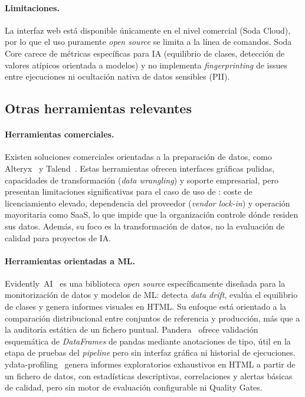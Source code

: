 \paragraph{Limitaciones.}
La interfaz web está disponible únicamente en el nivel comercial (Soda Cloud),
por lo que el uso puramente \emph{open source} se limita a la línea de
comandos.  Soda Core carece de métricas específicas para \ac{IA}
(equilibrio de clases, detección de valores atípicos orientada a modelos) y
no implementa \emph{fingerprinting} de issues entre ejecuciones ni
ocultación nativa de datos sensibles (\ac{PII}).

\subsection{Otras herramientas relevantes}
\label{sec:herramientas-comerciales}

\paragraph{Herramientas comerciales.}
Existen soluciones comerciales orientadas a la preparación de datos, como
Alteryx~\citep{alteryx} y Talend~\citep{talend}.  Estas herramientas ofrecen
interfaces gráficas pulidas, capacidades de transformación (\emph{data
wrangling}) y soporte empresarial, pero presentan limitaciones significativas
para el caso de uso de \dataqual: coste de licenciamiento elevado,
dependencia del proveedor (\emph{vendor lock-in}) y operación mayoritaria
como \ac{SaaS}, lo que impide que la organización controle dónde residen sus datos.  Además, su
foco es la transformación de datos, no la evaluación de calidad para
proyectos de \ac{IA}.

\paragraph{Herramientas orientadas a \ac{ML}.}
Evidently~AI~\citep{evidentlyai} es una biblioteca \emph{open source}
específicamente diseñada para la monitorización de datos y modelos de
\ac{ML}: detecta \emph{data drift}, evalúa el equilibrio de clases y genera
informes visuales en HTML.  Su enfoque está orientado a la comparación
distribucional entre conjuntos de referencia y producción, más que a la
auditoría estática de un fichero puntual.  Pandera~\citep{pandera} ofrece
validación esquemática de \emph{DataFrames} de pandas mediante anotaciones
de tipo, útil en la etapa de pruebas del \emph{pipeline} pero sin interfaz
gráfica ni historial de ejecuciones.  ydata-profiling~\citep{ydataprofiling}
genera informes exploratorios exhaustivos en HTML a partir de un fichero de
datos, con estadísticas descriptivas, correlaciones y alertas básicas de
calidad, pero sin motor de evaluación configurable ni Quality Gates.

